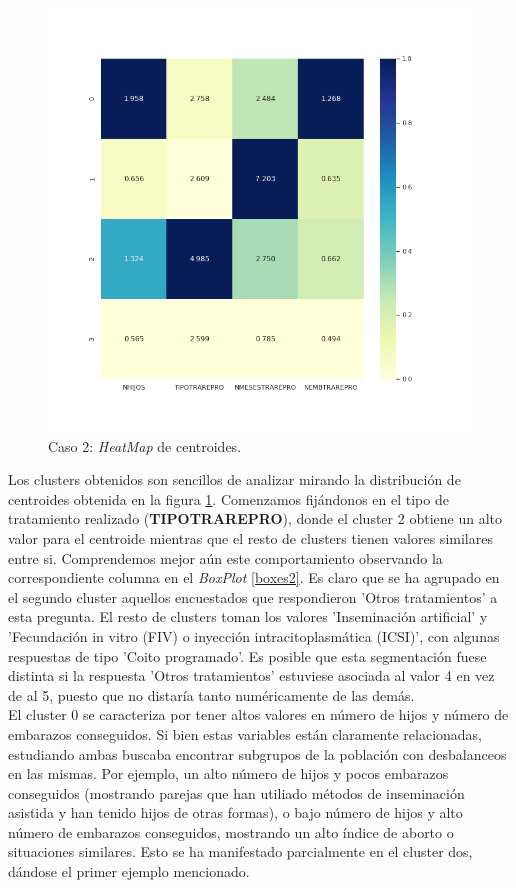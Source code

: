 \documentclass[11pt,a4paper]{article}
\begin{document}
	\begin{figure}[] 
		\centering
		\includegraphics[scale=0.5]{../Caso2/heatmap}
		\caption{Caso 2: \emph{HeatMap} de centroides.} 
		\label{heatmap2}
	\end{figure}

	Los clusters obtenidos son sencillos de analizar mirando la distribución de centroides obtenida en la figura \ref{heatmap2}. Comenzamos fijándonos en el tipo de tratamiento realizado (\textbf{TIPOTRAREPRO}), donde el cluster 2 obtiene un alto valor para el centroide mientras que el resto de clusters tienen valores similares entre si. Comprendemos mejor aún este comportamiento observando la correspondiente columna en el \emph{BoxPlot} \ref{boxes2}. Es claro que se ha agrupado en el segundo cluster aquellos encuestados que respondieron 'Otros tratamientos' a esta pregunta. El resto de clusters toman los valores 'Inseminación artificial' y 'Fecundación in vitro (FIV) o inyección intracitoplasmática (ICSI)', con algunas respuestas de tipo 'Coito programado'. Es posible que esta segmentación fuese distinta si la respuesta 'Otros tratamientos' estuviese asociada al valor 4 en vez de al 5, puesto que no distaría tanto numéricamente de las demás. \\
	
	El cluster 0 se caracteriza por tener altos valores en número de hijos y número de embarazos conseguidos. Si bien estas variables están claramente relacionadas, estudiando ambas buscaba encontrar subgrupos de la población con desbalanceos en las mismas. Por ejemplo, un alto número de hijos y pocos embarazos conseguidos (mostrando parejas que han utiliado métodos de inseminación asistida y han tenido hijos de otras formas), o bajo número de hijos y alto número de embarazos conseguidos, mostrando un alto índice de aborto o situaciones similares. Esto se ha manifestado parcialmente en el cluster dos, dándose el primer ejemplo mencionado. \\
	
\end{document}
